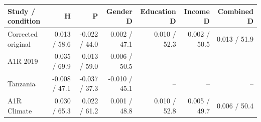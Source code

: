 
\begin{tabular}{lrrrrrr}
\toprule
Study / condition & H & P & Gender D & Education D & Income D & Combined D\\
\midrule
Corrected original & 0.013 / 58.6 & -0.022 / 44.0 & 0.002 / 47.1 & 0.010 / 52.3 & 0.002 / 50.5 & 0.013 / 51.9\\
A1R 2019 & 0.035 / 69.9 & 0.013 / 59.0 & 0.006 / 50.5 & -- & -- & --\\
Tanzania & -0.008 / 47.1 & -0.037 / 37.3 & -0.010 / 45.1 & -- & -- & --\\
A1R Climate & 0.030 / 65.3 & 0.022 / 61.2 & 0.001 / 48.8 & 0.010 / 52.8 & 0.005 / 49.7 & 0.006 / 50.4\\
\bottomrule
\end{tabular}
